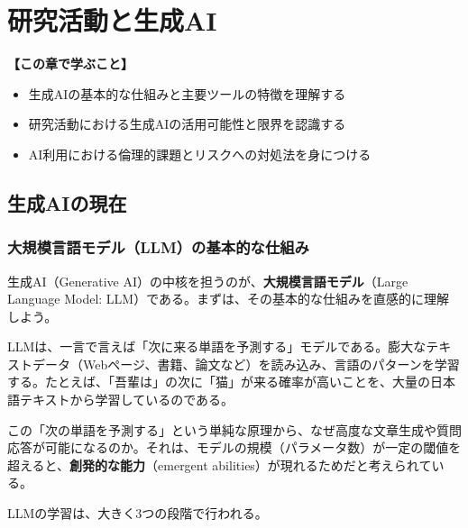 \chapter{研究活動と生成AI}
\label{chap1}

\begin{chapterbox}
\textbf{【この章で学ぶこと】}
\begin{itemize}
\item 生成AIの基本的な仕組みと主要ツールの特徴を理解する
\item 研究活動における生成AIの活用可能性と限界を認識する
\item AI利用における倫理的課題とリスクへの対処法を身につける
\end{itemize}
\end{chapterbox}
\vspace{5mm}

\section{生成AIの現在}
\label{sec:1.1}

\subsection{大規模言語モデル（LLM）の基本的な仕組み}

生成AI（Generative AI）の中核を担うのが、\textbf{大規模言語モデル}（Large Language Model: LLM）である。まずは、その基本的な仕組みを直感的に理解しよう。

LLMは、一言で言えば「次に来る単語を予測する」モデルである。膨大なテキストデータ（Webページ、書籍、論文など）を読み込み、言語のパターンを学習する。たとえば、「吾輩は」の次に「猫」が来る確率が高いことを、大量の日本語テキストから学習しているのである。

この「次の単語を予測する」という単純な原理から、なぜ高度な文章生成や質問応答が可能になるのか。それは、モデルの規模（パラメータ数）が一定の閾値を超えると、\textbf{創発的な能力}（emergent abilities）が現れるためだと考えられている。

LLMの学習は、大きく3つの段階で行われる。

